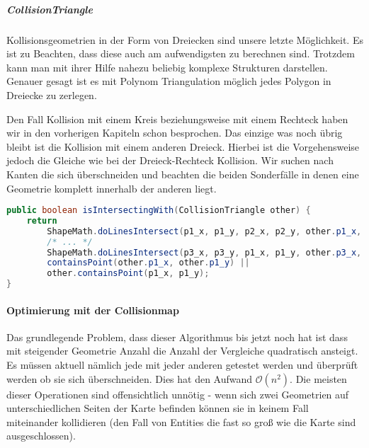 \subparagraph{CollisionTriangle}

Kollisionsgeometrien in der Form von Dreiecken sind unsere letzte Möglichkeit. Es ist zu Beachten, dass diese auch am aufwendigsten zu berechnen sind. Trotzdem kann man mit ihrer Hilfe nahezu beliebig komplexe Strukturen darstellen. Genauer gesagt ist es mit Polynom Triangulation möglich jedes Polygon in Dreiecke zu zerlegen.  \cite[S 32]{KRAY}

Den Fall Kollision mit einem Kreis beziehungsweise mit einem Rechteck haben wir in den vorherigen Kapiteln schon besprochen. Das einzige was noch übrig bleibt ist die Kollision mit einem anderen Dreieck. Hierbei ist die Vorgehensweise jedoch die Gleiche wie bei der Dreieck-Rechteck Kollision. Wir suchen nach Kanten die sich überschneiden und beachten die beiden Sonderfälle in denen eine Geometrie komplett innerhalb der anderen liegt.

\doinline
\begin{lstlisting}[caption=Erkennen von Kollisionen (Dreieck-Dreieck), title=\hspace{0 pt}, language=java]
public boolean isIntersectingWith(CollisionTriangle other) {
	return
		ShapeMath.doLinesIntersect(p1_x, p1_y, p2_x, p2_y, other.p1_x, other.p1_y, other.p2_x, other.p2_y) ||
		/* ... */
		ShapeMath.doLinesIntersect(p3_x, p3_y, p1_x, p1_y, other.p3_x, other.p3_y, other.p1_x, other.p1_y) ||
		containsPoint(other.p1_x, other.p1_y) ||
		other.containsPoint(p1_x, p1_y);
}
\end{lstlisting}

\paragraph{Optimierung mit der Collisionmap}

Das grundlegende Problem, dass dieser Algorithmus bis jetzt noch hat ist dass mit steigender Geometrie Anzahl die Anzahl der Vergleiche quadratisch ansteigt. 
Es müssen aktuell nämlich jede  mit jeder anderen getestet werden und überprüft werden ob sie sich überschneiden.
Dies hat den Aufwand $\mathcal O(n^2)$.
Die meisten dieser Operationen sind offensichtlich unnötig - wenn sich zwei Geometrien auf unterschiedlichen Seiten der Karte befinden können sie in keinem Fall miteinander kollidieren (den Fall von Entities die fast so groß wie die Karte sind ausgeschlossen).

